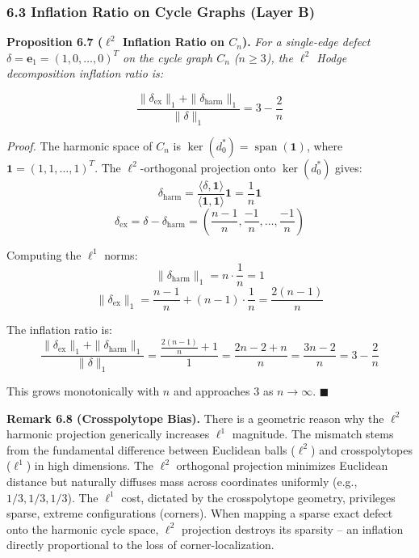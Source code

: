 \documentclass[
]{article}
\begin{document}
\subsubsection{\texorpdfstring{6.3 Inflation Ratio on Cycle Graphs
\textbf{(Layer
B)}}{6.3 Inflation Ratio on Cycle Graphs (Layer B)}}\label{inflation-ratio-on-cycle-graphs-layer-b}

\textbf{Proposition 6.7 (\(\ell^2\) Inflation Ratio on \(C_n\)).}
\emph{For a single-edge defect
\(\delta = \mathbf{e}_1 = (1, 0, \ldots, 0)^T\) on the cycle graph
\(C_n\) (\(n \geq 3\)), the \(\ell^2\) Hodge decomposition inflation
ratio is:}

\[ \frac{\|\delta_{\text{ex}}\|_1 + \|\delta_{\text{harm}}\|_1}{\|\delta\|_1} = 3 - \frac{2}{n} \]

\emph{Proof.} The harmonic space of \(C_n\) is
\(\ker(d_0^*) = \operatorname{span}(\mathbf{1})\), where
\(\mathbf{1} = (1,1,\ldots,1)^T\). The \(\ell^2\)-orthogonal projection
onto \(\ker(d_0^*)\) gives:
\[\delta_{\text{harm}} = \frac{\langle \delta, \mathbf{1} \rangle}{\langle \mathbf{1}, \mathbf{1} \rangle} \mathbf{1} = \frac{1}{n}\mathbf{1}\]
\[\delta_{\text{ex}} = \delta - \delta_{\text{harm}} = \left(\frac{n-1}{n}, \frac{-1}{n}, \ldots, \frac{-1}{n}\right)\]

Computing the \(\ell^1\) norms:
\[\|\delta_{\text{harm}}\|_1 = n \cdot \frac{1}{n} = 1\]
\[\|\delta_{\text{ex}}\|_1 = \frac{n-1}{n} + (n-1) \cdot \frac{1}{n} = \frac{2(n-1)}{n}\]

The inflation ratio is:
\[\frac{\|\delta_{\text{ex}}\|_1 + \|\delta_{\text{harm}}\|_1}{\|\delta\|_1} = \frac{\frac{2(n-1)}{n} + 1}{1} = \frac{2n - 2 + n}{n} = \frac{3n - 2}{n} = 3 - \frac{2}{n}\]

This grows monotonically with \(n\) and approaches 3 as
\(n \to \infty\). \(\blacksquare\)

\textbf{Remark 6.8 (Crosspolytope Bias).} There is a geometric reason
why the \(\ell^2\) harmonic projection generically increases \(\ell^1\)
magnitude. The mismatch stems from the fundamental difference between
Euclidean balls (\(\ell^2\)) and crosspolytopes (\(\ell^1\)) in high
dimensions. The \(\ell^2\) orthogonal projection minimizes Euclidean
distance but naturally diffuses mass across coordinates uniformly (e.g.,
\(1/3, 1/3, 1/3\)). The \(\ell^1\) cost, dictated by the crosspolytope
geometry, privileges sparse, extreme configurations (corners). When
mapping a sparse exact defect onto the harmonic cycle space, \(\ell^2\)
projection destroys its sparsity -- an inflation directly proportional
to the loss of corner-localization.
\end{document}
